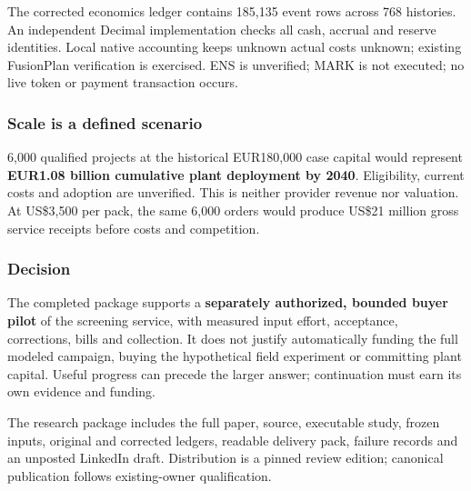 \documentclass[
  10pt,
  letterpaper,
]{article}
\begin{document}
The corrected economics ledger contains 185,135 event rows across 768
histories. An independent Decimal implementation checks all cash,
accrual and reserve identities. Local native accounting keeps unknown
actual costs unknown; existing FusionPlan verification is exercised. ENS
is unverified; MARK is not executed; no live token or payment
transaction occurs.

\hypertarget{scale-is-a-defined-scenario}{%
\subsubsection{Scale is a defined
scenario}\label{scale-is-a-defined-scenario}}

6,000 qualified projects at the historical EUR180,000 case capital would
represent \textbf{EUR1.08 billion cumulative plant deployment by 2040}.
Eligibility, current costs and adoption are unverified. This is neither
provider revenue nor valuation. At US\$3,500 per pack, the same 6,000
orders would produce US\$21 million gross service receipts before costs
and competition.

\hypertarget{decision}{%
\subsubsection{Decision}\label{decision}}

The completed package supports a \textbf{separately authorized, bounded
buyer pilot} of the screening service, with measured input effort,
acceptance, corrections, bills and collection. It does not justify
automatically funding the full modeled campaign, buying the hypothetical
field experiment or committing plant capital. Useful progress can
precede the larger answer; continuation must earn its own evidence and
funding.

The research package includes the full paper, source, executable study,
frozen inputs, original and corrected ledgers, readable delivery pack,
failure records and an unposted LinkedIn draft. Distribution is a pinned
review edition; canonical publication follows existing-owner
qualification.
\end{document}
